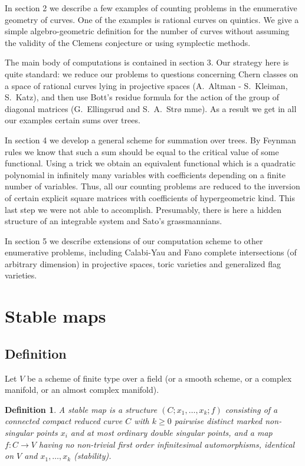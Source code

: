 \documentclass{amsart}
\newtheorem*{dfn}{Definition}
\begin{document}
In section 2 we describe a few examples of counting problems in the enumerative
geometry of curves. One of the examples is rational curves on quintics. We give
a simple algebro-geometric definition for the number of curves without assuming
the validity of the Clemens conjecture or using symplectic methods.


The main body of computations is contained in section 3.
  Our strategy here is quite standard: we reduce our problems to questions
concerning Chern classes on a space of rational curves lying in projective
spaces (A.~Altman - S.~Kleiman, S.~Katz), and then use Bott's residue formula
for the action of the group of diagonal matrices (G.~Ellingsrud and S.~A.~Str\o
mme).  As a result we get in all our examples  certain sums over trees.

In section 4 we develop a general scheme for summation over trees.
 By Feynman rules we know that such a sum should be equal to the critical value
of some functional. Using a trick we obtain an equivalent functional which is a
 quadratic polynomial in infinitely many variables with coefficients depending
on a finite number of variables. Thus, all our counting problems are reduced to
the inversion of  certain explicit square matrices with coefficients of
hypergeometric kind. This last step we were not able to accomplish.
Presumably, there is here a hidden structure of an integrable system and Sato's
grassmannians.


 In section 5 we describe extensions of our computation scheme to other
enumerative problems, including Calabi-Yau and Fano complete intersections (of
arbitrary dimension) in projective spaces, toric varieties and generalized flag
varieties.




\section{Stable maps}

\subsection{Definition}

Let $V$ be a scheme of finite type over a field (or a smooth scheme, or a
complex manifold, or an almost complex manifold).

\begin{dfn}
A stable map is a structure $(C;x_1,\dots,x_k;f)$ consisting of a
 connected compact reduced curve $C$ with $k\ge 0$ pairwise distinct marked
non-singular points $x_i$ and at most ordinary double singular points, and a
map $f:C\to V$ having no non-trivial first order infinitesimal automorphisms,
identical on $V$ and $x_1,\dots,x_k$ (stability).
\end{dfn}
\end{document}
